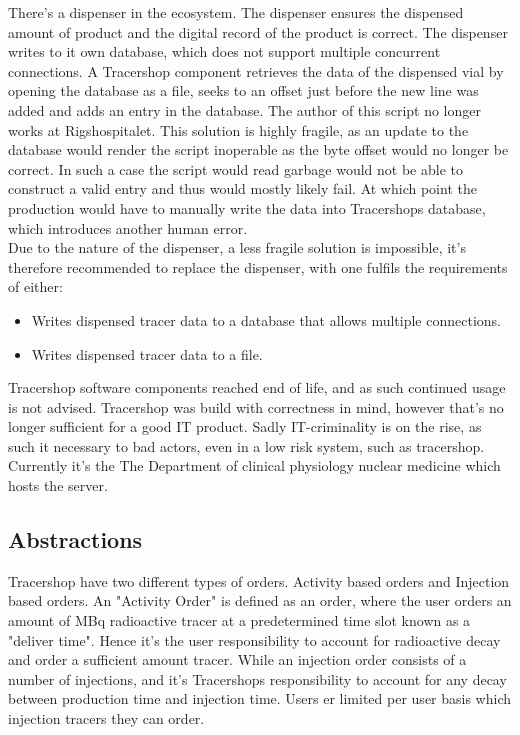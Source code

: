 \documentclass{article}
\begin{document}
There's a dispenser in the ecosystem. The dispenser ensures the dispensed amount of product and the digital record of the product is correct.
The dispenser writes to it own database, which does not support multiple concurrent connections.
A Tracershop component retrieves the data of the dispensed vial by opening the database as a file, seeks to an offset just before the new line was added and
adds an entry in the database. The author of this script no longer works at Rigshospitalet. This solution is highly fragile, as an update to the database would
render the script inoperable as the byte offset would no longer be correct.
In such a case the script would read garbage would not be able to construct a valid entry and thus would mostly likely fail.
At which point the production would have to manually write the data into Tracershops database, which introduces another human error.\\
Due to the nature of the dispenser, a less fragile solution is impossible, it's therefore recommended to replace the dispenser, with one fulfils the requirements of either:
\begin{itemize}
  \item Writes dispensed tracer data to a database that allows multiple connections.
  \item Writes dispensed tracer data to a file.
\end{itemize}
Tracershop software components reached end of life, and as such continued usage is not advised. Tracershop was build with correctness in mind,
however that's no longer sufficient for a good IT product. Sadly IT-criminality is on the rise, as such it necessary to bad actors, even in a low risk system,
such as tracershop.\\
Currently it's the The Department of clinical physiology nuclear medicine which hosts the server.


\subsection*{Abstractions}
Tracershop have two different types of orders. Activity based orders and Injection based orders.
An "Activity Order" is defined as an order, where the user orders an amount of MBq radioactive tracer at a predetermined time slot known as a "deliver time".
Hence it's the user responsibility to account for radioactive decay and order a sufficient amount tracer.
While an injection order consists of a number of injections, and it's Tracershops responsibility to account for any decay between production time and injection time.
Users er limited per user basis which injection tracers they can order.
\end{document}
